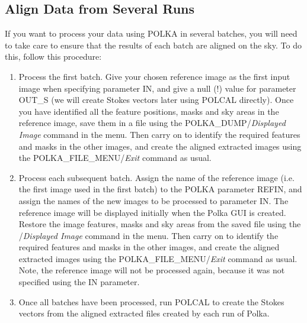 \documentclass[11pt,nolof]{starlink}
\providecommand{\mylabel}[1] {\xlabel{#1}\label{#1}}
\begin{document}
\subsection {\mylabel{POLKA_MULTI_RUN}Align Data from Several Runs}
If you want to process your data using POLKA in several batches, you will
need to take care to ensure that the results of each batch are aligned on
the sky. To do this, follow this procedure:

\begin{enumerate}

\item Process the first batch. Give your chosen reference image as the
first input image when specifying parameter IN, and give a null (!) value
for parameter OUT\_S (we will create Stokes vectors later using POLCAL
directly). Once you have identified all the feature positions, masks and
sky areas in the reference image, save them in a file using the
 {POLKA_DUMP}/\emph{Displayed Image} command in the
 menu. Then carry on to identify the
required features and masks in the other images, and create the
aligned extracted images using the 
{POLKA_FILE_MENU}/\emph{Exit} command as usual.

\item Process each subsequent batch. Assign the name of the reference
image (i.e. the first image used in the first batch) to the POLKA
parameter REFIN, and assign the names of the new images to be processed
to parameter IN. The reference image will be displayed initially when the
Polka GUI is created. Restore the image features, masks and sky areas
from the saved file using the /\emph{Displayed Image} command in the 
menu. Then carry on to identify the required features and masks in the
other images, and create the aligned extracted images using the
 {POLKA_FILE_MENU}/\emph{Exit} command as usual. Note,
the reference image will not be processed again, because it was not
specified using the IN parameter.

\item Once all batches have been processed, run POLCAL to create the
Stokes vectors from the aligned extracted files created by each run of
Polka.

\end{enumerate}
\end{document}
